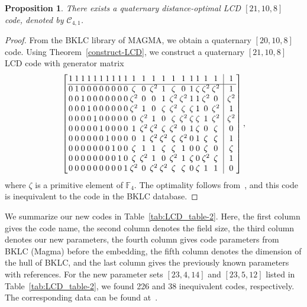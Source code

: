 \documentclass{article}
\newtheorem{proposition}[theorem]{Proposition}
\theoremstyle{definition}
\theoremstyle{remark}
\begin{document}
\begin{proposition}\label{quaternary-new-code}
    There exists a quaternary distance-optimal LCD $[21, 10, 8]$ code, denoted by $\mathcal C_{4,1}$.
\end{proposition}
\begin{proof}
From the BKLC library of MAGMA, we obtain a quaternary $[20, 10, 8]$ code. Using Theorem~\ref{construct-LCD}, we construct a quaternary $[21, 10, 8]$ LCD code with generator matrix
    \[
    \setlength{\arraycolsep}{1.2pt}
    \left[
    \begin{array}{cccccccccccccccccccc|c}
    1 & 1 & 1 & 1 & 1 & 1 & 1 & 1 & 1 & 1 & 1 & 1 & 1 & 1 & 1 & 1 & 1 & 1 & 1 & 1 ~& ~1 \\ \hline
    0 & 1 & 0 & 0 & 0 & 0 & 0 & 0 & 0 & 0 & \zeta & 0 & \zeta^2 & 1 & \zeta & 0 & 1 & \zeta & \zeta^2 & \zeta^2 ~&~ 1 \\
    0 & 0 & 1 & 0 & 0 & 0 & 0 & 0 & 0 & 0 & \zeta^2 & 0 & 0 & 1 & \zeta^2 & \zeta^2 & 1 & 1 & \zeta^2 & 0 ~& ~\zeta^2 \\
    0 & 0 & 0 & 1 & 0 & 0 & 0 & 0 & 0 & 0 & \zeta^2 & 1 & 0 & \zeta & \zeta^2 & \zeta & \zeta & 1 & 0 & \zeta^2 ~&~ 1 \\
    0 & 0 & 0 & 0 & 1 & 0 & 0 & 0 & 0 & 0 & 0 & \zeta^2 & 1 & 0 & \zeta & \zeta^2 & \zeta & \zeta & 1 & \zeta^2 ~&~ \zeta^2 \\
    0 & 0 & 0 & 0 & 0 & 1 & 0 & 0 & 0 & 0 & 1 & \zeta^2 & \zeta^2 & \zeta & \zeta^2 & 0 & 1 & \zeta & 0 & \zeta ~&~ 0 \\
    0 & 0 & 0 & 0 & 0 & 0 & 1 & 0 & 0 & 0 & 0 & 1 & \zeta^2 & \zeta^2 & \zeta & \zeta^2 & 0 & 1 & \zeta & \zeta ~&~ 1 \\
    0 & 0 & 0 & 0 & 0 & 0 & 0 & 1 & 0 & 0 & \zeta & 1 & 1 & \zeta & \zeta & 1 & 0 & 0 & \zeta & 0 ~&~ \zeta \\
    0 & 0 & 0 & 0 & 0 & 0 & 0 & 0 & 1 & 0 & \zeta & \zeta^2 & 1 & 0 & \zeta^2 & 1 & \zeta & 0 & \zeta^2 & \zeta ~&~ 1 \\
    0 & 0 & 0 & 0 & 0 & 0 & 0 & 0 & 0 & 1 & \zeta^2 & 0 & \zeta^2 & \zeta^2 & \zeta & \zeta & 0 & \zeta & 1 & 1 ~&~ 0
    \end{array}
    \right],
    \]
where $\zeta$ is a primitive element of $\mathbb{F}_4$. The optimality follows from~\cite{Lu-quaternary-LCD}, and this code is inequivalent to the code in the BKLC database.
\end{proof}


We summarize our new codes in Table~\ref{tab:LCD_table-2}. Here, the first column gives the code name, the second column denotes the field size, the third column denotes our new parameters, the fourth column gives code parameters from BKLC (Magma)  before the embedding, the fifth column denotes the dimension of the hull of BKLC, and the last column gives the previously known parameters with references. For the new parameter sets \([23,4,14]\) and \([23,5,12]\) listed in Table~\ref{tab:LCD_table-2}, we found 226 and 38 inequivalent codes, respectively. The corresponding data can be found at~\cite{An-git}.
\end{document}
